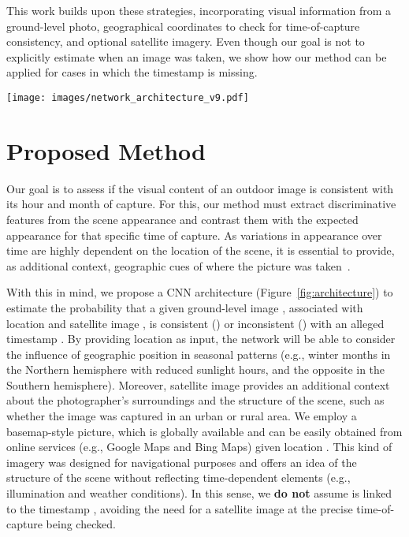 \documentclass[journal]{IEEEtran}
\begin{document}
        This work builds upon these strategies, incorporating visual information from a ground-level photo, geographical coordinates to check for time-of-capture consistency, and optional satellite imagery. Even though our goal is not to explicitly estimate when an image was taken, we show how our method can be applied for cases in which the timestamp is missing.



    \begin{figure*}\centering
        \texttt{[image: images/network\_architecture\_v9.pdf]}
        \caption{An overview of our approach. A ground-level image , a timestamp , geo-coordinates , and a satellite image  have their features extracted by encoder networks and then fed to task-specific branches. One network branch predicts the consistency label , while auxiliary branches estimate transient attributes  and . The network is optimized by a combination of cross-entropy and mean squared error losses.  At inference time, the consistency answer  is considered for the tampering detection, while  and  offer insights about the decision of the network.}
        \label{fig:architecture}
    \end{figure*}

\section{Proposed Method}
    Our goal is to assess if the visual content of an outdoor image is consistent with its hour and month of capture. For this, our method must extract discriminative features from the scene appearance and contrast them with the expected appearance for that specific time of capture. As variations in appearance over time are highly dependent on the location of the scene, it is essential to provide, as additional context, geographic cues of where the picture was taken~\cite{salem2020learning, zhai2018geotemporal}.  
    
    With this in mind, we propose a CNN architecture (Figure~\ref{fig:architecture}) to estimate the probability  that a given ground-level image , associated with location  and satellite image , is consistent () or inconsistent () with an alleged timestamp . By providing location  as input, the network will be able to consider the influence of geographic position in seasonal patterns (e.g., winter months in the Northern hemisphere with reduced sunlight hours, and the opposite in the Southern hemisphere). Moreover,  satellite image  provides an additional context about the photographer's surroundings and the structure of the scene, such as whether the image was captured in an urban or rural area. We employ a basemap-style picture, which is globally available and can be easily obtained from online services (e.g., Google Maps and Bing Maps) given location . This kind of imagery was designed for navigational purposes and offers an idea of the structure of the scene without reflecting time-dependent elements (e.g., illumination and weather conditions). In this sense, we \textbf{do not} assume  is linked to the timestamp , avoiding the need for a satellite image at the precise time-of-capture being checked.
    
\end{document}
